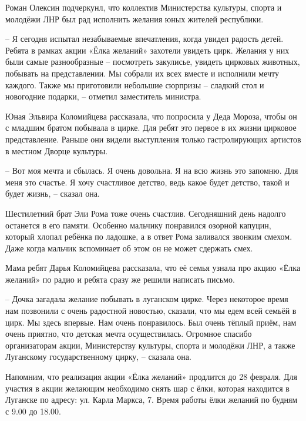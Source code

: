 
Роман Олексин подчеркунл, что коллектив Министерства культуры, спорта и
молодёжи ЛНР был рад исполнить желания юных жителей республики.

– Я сегодня испытал незабываемые впечатления, когда увидел радость детей.
Ребята в рамках акции «Ёлка желаний» захотели увидеть цирк. Желания у них были
самые разнообразные – посмотреть закулисье, увидеть цирковых животных, побывать
на представлении. Мы собрали их всех вместе и исполнили мечту каждого.  Также
мы приготовили небольшие сюрпризы – сладкий стол и новогодние подарки, –
отметил заместитель министра.

Юная Эльвира Коломийцева рассказала, что попросила у Деда Мороза, чтобы он с
младшим братом побывала в цирке. Для ребят это первое в их жизни цирковое
представление. Раньше они видели выступления только гастролирующих артистов в
местном Дворце культуры.

– Вот моя мечта и сбылась. Я очень довольна. Я на всю жизнь это запомню. Для
меня это счастье. Я хочу счастливое детство, ведь какое будет детство, такой и
будет жизнь, – сказал она.


Шестилетний брат Эли Рома тоже очень счастлив. Сегодняшний день надолго
останется в его памяти. Особенно мальчику понравился озорной капуцин, который
хлопал ребёнка по ладошке, а в ответ Рома заливался звонким смехом. Даже когда
мальчик вспоминает об этом он не может сдержать смех.

Мама ребят Дарья Коломийцева рассказала, что её семья узнала про акцию «Ёлка
желаний» по радио и ребята сразу же решили написать письмо.

– Дочка загадала желание побывать в луганском цирке. Через некоторое время нам
позвонили с очень радостной новостью,  сказали, что мы едем всей семьёй в цирк.
Мы здесь впервые. Нам очень понравилось. Был очень тёплый приём, нам очень
приятно, что детская мечта осуществилась. Огромное спасибо организаторам акции,
Министерству культуры, спорта и молодёжи ЛНР, а также Луганскому
государственному цирку, – сказала она.

Напомним, что реализация акции «Ёлка желаний» продлится до 28 февраля.  Для
участия в акции желающим необходимо снять шар с ёлки, которая находится в
Луганске по адресу: ул. Карла Маркса, 7. Время работы ёлки желаний по будням с
9.00 до 18.00.
